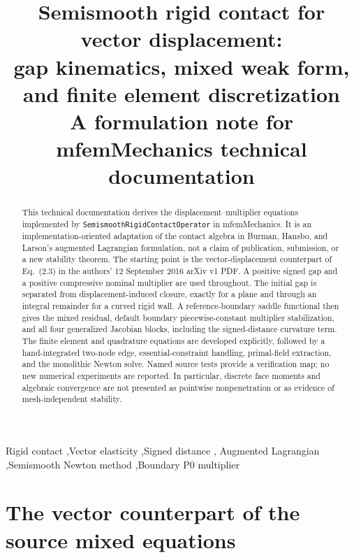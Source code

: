 \documentclass[preprint,11pt]{elsarticle}
\numberwithin{equation}{section}
\begin{document}
\begin{frontmatter}
\title{Semismooth rigid contact for vector displacement:\\
gap kinematics, mixed weak form, and finite element discretization\\[3pt]
\large A formulation note for mfemMechanics technical documentation}
\begin{abstract}
This technical documentation derives the displacement--multiplier equations
implemented by \texttt{SemismoothRigidContactOperator} in mfemMechanics.
It is an implementation-oriented adaptation of the contact algebra in
Burman, Hansbo, and Larson's augmented Lagrangian formulation, not a claim of
publication, submission, or a new stability theorem. The starting point is
the vector-displacement counterpart of Eq.~(2.3) in the authors'
12 September 2016 arXiv v1 PDF. A positive signed gap and a positive
compressive nominal multiplier are used throughout. The initial gap is
separated from displacement-induced closure, exactly for a plane and through
an integral remainder for a curved rigid wall. A reference-boundary saddle
functional then gives the mixed residual, default boundary piecewise-constant
multiplier stabilization, and all four generalized Jacobian blocks,
including the signed-distance curvature term. The finite element and
quadrature equations are developed explicitly, followed by a hand-integrated
two-node edge, essential-constraint handling, primal-field extraction, and
the monolithic Newton solve. Named source tests provide a verification map;
no new numerical experiments are reported. In particular, discrete face
moments and algebraic convergence are not presented as pointwise
nonpenetration or as evidence of mesh-independent stability.
\end{abstract}
\begin{keyword}
Rigid contact \sep Vector elasticity \sep Signed distance \sep
Augmented Lagrangian \sep Semismooth Newton method \sep Boundary P0 multiplier
\end{keyword}
\end{frontmatter}

\section{The vector counterpart of the source mixed equations}
\label{sec:lead}
\end{document}
